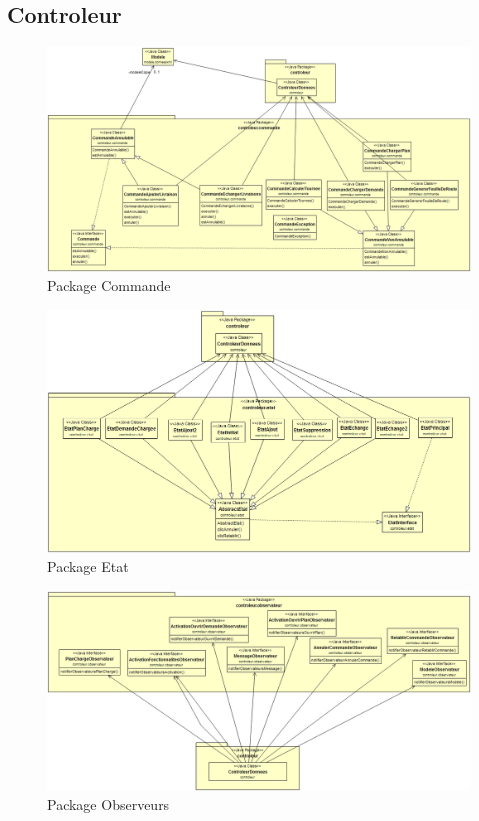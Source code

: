 \documentclass[10pt,a4paper]{book}
\begin{document}
\subsection{Controleur}
\begin{figure}[h!]
    \centering
    \includegraphics[scale=0.28]{DcCommande.png}
    \caption{Package Commande}
\end{figure}
\begin{figure}[h!]
    \centering
    \includegraphics[scale=0.28]{DcEtat.png}
    \caption{Package Etat}
\end{figure}
\begin{figure}[h!]
    \centering
    \includegraphics[scale=0.28]{DcObservateur.png}
    \caption{Package Observeurs}
\end{figure}
\end{document}
